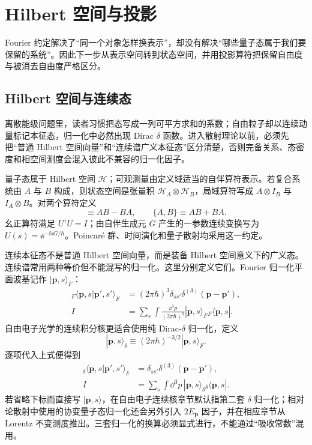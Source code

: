 \section{Hilbert 空间与投影}

Fourier 约定解决了“同一个对象怎样换表示”，却没有解决“哪些量子态属于我们要保留的系统”。因此下一步从表示空间转到状态空间，并用投影算符把保留自由度与被消去自由度严格区分。

\subsection{Hilbert 空间与连续态}
离散能级问题里，读者习惯把态写成一列可平方求和的系数；自由粒子却以连续动量标记本征态，归一化中必然出现 Dirac $\delta$ 函数。进入散射理论以前，必须先把“普通 Hilbert 空间向量”和“连续谱广义本征态”区分清楚，否则完备关系、态密度和相空间测度会混入彼此不兼容的归一化因子。

量子态属于 Hilbert 空间 $\mathcal H$；可观测量由定义域适当的自伴算符表示。若复合系统由 $A$ 与 $B$ 构成，则状态空间是张量积 $\mathcal H_A\otimes\mathcal H_B$，局域算符写成 $A\otimes I_B$ 与 $I_A\otimes B$。对两个算符定义
\begin{equation*}
[A,B]\equiv AB-BA,
\qquad
\{A,B\}\equiv AB+BA.
\end{equation*}
幺正算符满足 $U^\dagger U=I$；由自伴生成元 $G$ 产生的一参数连续变换写为 $U(s)=\ee^{-\ii sG/\hbar}$。Poincar\'e 群、时间演化和量子散射均采用这一约定。

连续本征态不是普通 Hilbert 空间向量，而是装备 Hilbert 空间意义下的广义态。连续谱常用两种等价但不能混写的归一化。这里分别定义它们。Fourier 归一化平面波基记作 $|\mathbf p,s\rangle_F$：
\begin{align}
{}_F\!\langle\mathbf p,s|\mathbf p',s'\rangle_F
&=(2\pi\hbar)^3\delta_{ss'}\delta^{(3)}(\mathbf p-\mathbf p'),\\
I&=\sum_s\int\frac{\dd^3 p}{(2\pi\hbar)^3}
|\mathbf p,s\rangle_F{}_F\!\langle\mathbf p,s|.
\label{eq:global-continuum-normalization-fourier}
\end{align}
自由电子光学的连续积分核更适合使用纯 Dirac-$\delta$ 归一化，定义
\begin{equation}
|\mathbf p,s\rangle_\delta
\equiv(2\pi\hbar)^{-3/2}|\mathbf p,s\rangle_F.
\label{eq:delta-normalized-state-definition}
\end{equation}
逐项代入上式便得到
\begin{align}
{}_{\delta}\!\langle\mathbf p,s|\mathbf p',s'\rangle_{\delta}
&=\delta_{ss'}\delta^{(3)}(\mathbf p-\mathbf p'),\\
I&=\sum_s\int \dd^3 p\,
|\mathbf p,s\rangle_\delta{}_{\delta}\!\langle\mathbf p,s|.
\label{eq:global-continuum-normalization-delta}
\end{align}
若省略下标而直接写 $|\mathbf p,s\rangle$，在自由电子连续核章节默认指第二套 $\delta$ 归一化；相对论散射中使用的协变量子态归一化还会另外引入 $2E_{\mathbf p}$ 因子，并在相应章节从 Lorentz 不变测度推出。三套归一化的换算必须显式进行，不能通过“吸收常数”混用。

